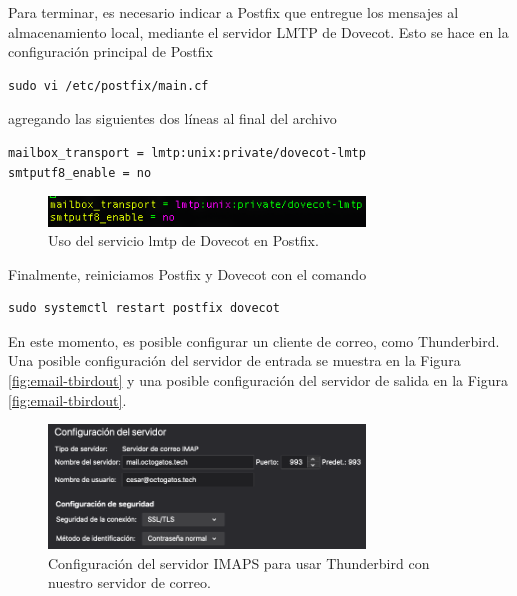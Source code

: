 \documentclass{article}
\begin{document}
Para terminar, es necesario indicar a Postfix que
entregue los mensajes al almacenamiento local,
mediante el servidor LMTP de Dovecot.   Esto se
hace en la configuraci\'on principal de Postfix
\begin{lstlisting}
sudo vi /etc/postfix/main.cf
\end{lstlisting}
agregando las siguientes dos l\'ineas al final
del archivo
\begin{lstlisting}
mailbox_transport = lmtp:unix:private/dovecot-lmtp
smtputf8_enable = no
\end{lstlisting}

\begin{figure}[H]
  \centering
  \includegraphics[width=0.75\textwidth]{email/lmtp2}
  \caption{Uso del servicio lmtp de Dovecot en Postfix.}
  \label{fig:email-lmtp2}
\end{figure}

Finalmente, reiniciamos Postfix y Dovecot con
el comando
\begin{lstlisting}
sudo systemctl restart postfix dovecot
\end{lstlisting}

En este momento, es posible configurar un cliente
de correo, como Thunderbird.   Una posible
configuraci\'on del servidor de entrada se
muestra en la Figura \ref{fig:email-tbirdout}
y una posible configuraci\'on del servidor
de salida en la Figura \ref{fig:email-tbirdout}.

\begin{figure}[H]
  \centering
  \includegraphics[width=0.75\textwidth]{email/tbirdin}
  \caption{Configuraci\'on del servidor IMAPS para
           usar Thunderbird con nuestro servidor de correo.}
  \label{fig:email-tbirdin}
\end{figure}
\end{document}
